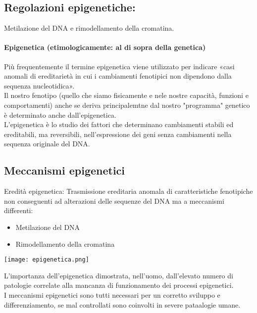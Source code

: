 \documentclass{article}
\begin{document}
\subsection{Regolazioni epigenetiche:}
Metilazione del DNA e rimodellamento della cromatina.
\paragraph{Epigenetica (etimologicamente: al di sopra della genetica)}
Più frequentemente il termine epigenetica viene utilizzato per indicare «casi anomali di ereditarietà in cui i
cambiamenti fenotipici non dipendono dalla sequenza nucleotidica».\\
Il nostro fenotipo (quello che siamo fisicamente e nele nostre capacità, funzioni e comportamenti) anche se deriva principalemtne dal nostro "programma" genetico è determinato anche dall'epigenetica.\\
L'epigenetica è lo studio dei fattori che determinano cambiamenti stabili ed ereditabili, ma reversibili, nell'espressione dei geni senza cambiamenti nella sequenza originale del DNA.
\subsection{Meccanismi epigenetici}
Eredità epigenetica: Trasmissione ereditaria anomala di caratteristiche fenotipiche
non conseguenti ad alterazioni delle sequenze del DNA ma a meccanismi differenti:
\begin{itemize}
    \item Metilazione del DNA
    \item Rimodellamento della cromatina
\end{itemize}
\begin{center}
    \texttt{[image: epigenetica.png]}
\end{center}
L'importanza dell'epigenetica dimostrata, nell'uomo, dall'elevato numero di
patologie correlate alla mancanza di funzionamento dei processi epigenetici.\\
I meccanismi epigenetici sono tutti necessari per un corretto sviluppo e differenziamento, se mal controllati sono coinvolti in severe pataalogie umane.
\end{document}
